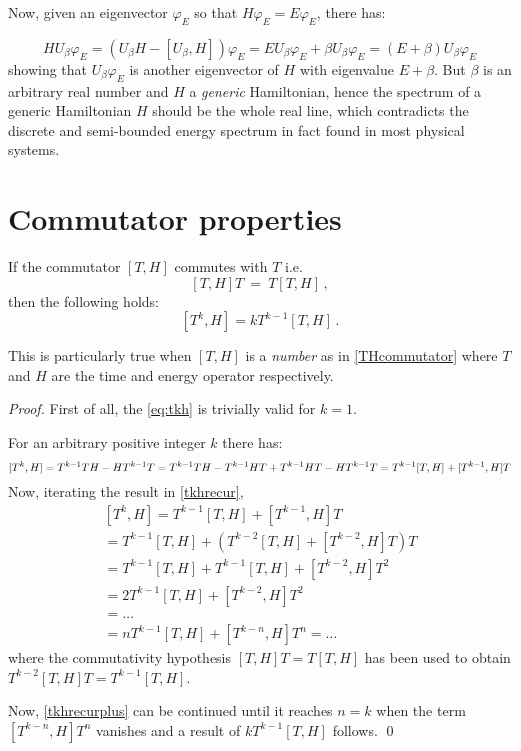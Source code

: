 \documentclass[a4paper,12pt]{article}
\begin{document}
Now, given an eigenvector $\varphi_{E}$ so that $H\varphi_{E}=E\varphi_{E}$, there has:

$$
HU_{\beta}\varphi_{E} = (U_{\beta}H - [U_{\beta}, H])\varphi_{E} =
EU_{\beta}\varphi_{E} + \beta U_{\beta}\varphi_{E} = (E+\beta)U_{\beta}\varphi_{E}
$$
showing that $U_{\beta}\varphi_{E}$ is another eigenvector of $H$ with eigenvalue
$E+\beta$. But $\beta$ is an arbitrary real number and $H$ a \emph{generic} Hamiltonian,
hence the spectrum of a generic Hamiltonian $H$ should
be the whole real line, which contradicts the discrete and semi-bounded energy spectrum
in fact found in most physical systems.

\appendix\section{Commutator properties}
\begin{lemma}\label{CommProp}
If the commutator $[T, H]$ commutes with $T$ i.e.
$$[T, H]T~=~T[T, H]\,,$$ then the following holds:
\begin{equation}\label{eq:tkh}
[T^k, H] = kT^{k-1}[T, H]\,.
\end{equation}
\end{lemma}
This is particularly true when $[T, H]$ is a \emph{number} as in \eqref{THcommutator} where
$T$ and $H$ are the time and energy operator respectively.
\begin{proof}
First of all, the \eqref{eq:tkh} is trivially valid for $k = 1$.

For an arbitrary positive integer $k$ there has:
\begin{dmath}\label{tkhrecur}
[T^k, H] = T^{k-1}TH - HT^{k-1}T = T^{k-1}TH - T^{k-1}HT + T^{k-1}HT - HT^{k-1}T \\
    = T^{k-1}[T, H] + [T^{k-1}, H]T
\end{dmath}
Now, iterating the result in \eqref{tkhrecur},
\begin{multline}\label{tkhrecurplus}
[T^k, H] = T^{k-1}[T, H] + [T^{k-1}, H]T \\
= T^{k-1}[T, H] + (T^{k-2}[T, H] + [T^{k-2}, H]T)T \\
= T^{k-1}[T, H] +  T^{k-1}[T, H] + [T^{k-2}, H]T^2 \\
= 2T^{k-1}[T, H] + [T^{k-2}, H]T^2 \\
= \hdots \\
= nT^{k-1}[T, H] + [T^{k-n}, H]T^n = \hdots
\end{multline}
where the commutativity hypothesis $[T, H]T = T[T, H]$ has been used to obtain $T^{k-2}[T, H]T = T^{k-1}[T, H]$.

Now, \eqref{tkhrecurplus} can be continued until it reaches $n=k$ when the term
$[T^{k-n}, H]T^n$ vanishes and a result of $kT^{k-1}[T, H]$ follows. \qed
\end{proof}



\end{document}
